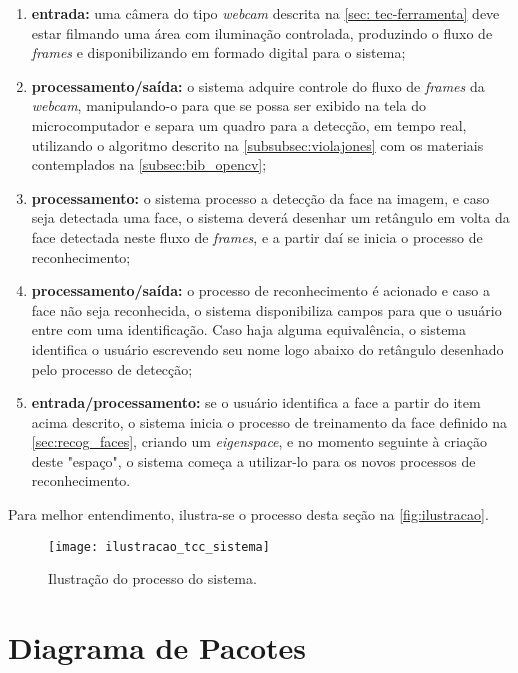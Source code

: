 \begin{enumerate}
	\item \textbf{entrada:} uma câmera do tipo \textit{webcam} descrita na \autoref{sec: tec-ferramenta} deve estar filmando uma área com iluminação controlada, produzindo o fluxo de \textit{frames} e disponibilizando em formado digital para o sistema;
	
	\item \textbf{processamento/saída:} o sistema adquire controle do fluxo de \textit{frames} da \textit{webcam}, manipulando-o para que se possa ser exibido na tela do microcomputador e separa um quadro para a detecção, em tempo real, utilizando o algoritmo descrito na \autoref{subsubsec:violajones} com os materiais contemplados na \autoref{subsec:bib_opencv};
	
	\item \textbf{processamento:} o sistema processo a detecção da face na imagem, e caso seja detectada uma face, o sistema deverá desenhar um retângulo em volta da face detectada neste fluxo de \textit{frames}, e a partir daí se inicia o processo de reconhecimento;
	
	\item \textbf{processamento/saída:} o processo de reconhecimento é acionado e caso a face não seja reconhecida, o sistema disponibiliza campos para que o usuário entre com uma identificação. Caso haja alguma equivalência, o sistema identifica o usuário escrevendo seu nome logo abaixo do retângulo desenhado pelo processo de detecção;
	
	\item \textbf{entrada/processamento:} se o usuário identifica a face a partir do item acima descrito, o sistema inicia o processo de treinamento da face definido na \autoref{sec:recog_faces}, criando um \textit{eigenspace}, e no momento seguinte à criação deste "espaço", o sistema começa a utilizar-lo para os novos processos de reconhecimento.
\end{enumerate}

Para melhor entendimento, ilustra-se o processo desta seção na \autoref{fig:ilustracao}.

\begin{figure}[h]
	\centering
	\texttt{[image: ilustracao\_tcc\_sistema]}
	\caption{Ilustração do processo do sistema.}
	\label{fig:ilustracao}
\end{figure}


\section{Diagrama de Pacotes}\label{sec:diagpacs}

